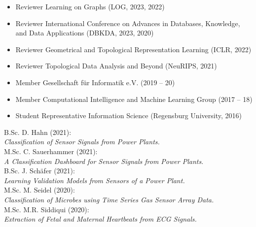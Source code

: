 \documentclass[a4paper,11pt]{article}
\newcommand{\years}[1]{\marginnote{\scriptsize #1}}
\begin{document}
\years{Service}
\vspace{-2pt}
\begin{itemize}[noitemsep, leftmargin=*]
    \item Reviewer Learning on Graphs (LOG, 2023, 2022)
    \item Reviewer International Conference on Advances in Databases, Knowledge,
and Data Applications (DBKDA, 2023, 2020)
    \item Reviewer Geometrical and Topological Representation Learning (ICLR, 2022)
    \item Reviewer Topological Data Analysis and Beyond (NeuRIPS, 2021)
    \item Member Gesellschaft für Informatik e.V. (2019 -- 20)
    \item Member Computational Intelligence and Machine Learning Group (2017 -- 18)
    \item Student Representative Information Science (Regensburg University, 2016)
\end{itemize}
\vspace{10pt}

\years{Supervision} B.Sc. D. Hahn (2021):\\
\emph{Classification of Sensor Signals from Power Plants.} \\
M.Sc. C. Sauerhammer (2021): \\
\emph{A Classification Dashboard for Sensor Signals from Power Plants.} \\
B.Sc. J. Schäfer (2021): \\
\emph{Learning Validation Models from Sensors of a Power Plant.} \\
M.Sc. M. Seidel (2020): \\ 
\emph{Classification of Microbes using Time Series Gas Sensor Array Data.} \\
M.Sc. M.R. Siddiqui (2020): \\
\emph{Extraction of Fetal and Maternal Heartbeats from ECG Signals.}

\end{document}
